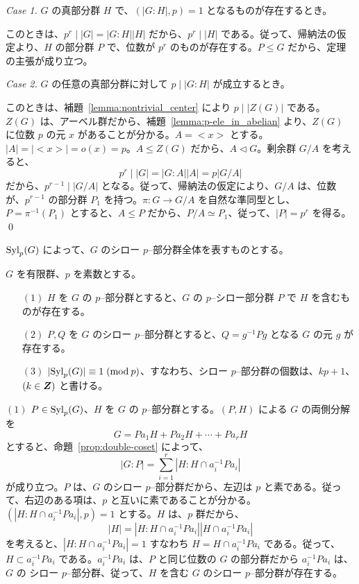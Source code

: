 {\em Case 1.\quad} $G$ の真部分群 $H$ で、$(|G:H|,p) = 1$ となるものが存在するとき。

このときは、$p^r\mid |G| = |G:H||H|$ だから、$p^r\mid |H|$ である。従って、帰納法の仮定より、$H$ の部分群 $P$ で、位数が $p^r$ のものが存在する。$P\leq G$ だから、定理の主張が成り立つ。

\smallskip
{\em Case 2. \quad} $G$ の任意の真部分群に対して $p\mid |G:H|$ が成立するとき。

このときは、補題~\ref{lemma:nontrivial_center} により $p\mid |Z(G)|$ である。$Z(G)$ は、アーベル群だから、補題~\ref{lemma:p-ele_in_abelian} より、$Z(G)$ に位数 $p$ の元 $x$ があることが分かる。$A = <x>$ とする。$|A| = |<x>| = o(x) = p$。$A\leq Z(G)$ だから、$A\lhd G$。剰余群 $G/A$ を考えると、
$$p^r \mid |G| = |G:A||A| = p|G/A|$$
だから、$p^{r-1}\mid |G/A|$ となる。従って、帰納法の仮定により、$G/A$ は、位数が、$p^{r-1}$ の部分群 $P_1$ を持つ。$\pi:G \to G/A$ を自然な準同型とし、$P = \pi^{-1}(P_1)$ とすると、$A \leq P$ だから、$P/A\simeq P_1$、従って、$|P| = p^r$ を得る。
\qed

\medskip
$\mbox{{\rm Syl}}_p(G)$ によって、$G$ のシロー $p$--部分群全体を表すものとする。
\begin{thm} \label{thm:sylow:conjugate}
$G$ を有限群、$p$ を素数とする。
\begin{itemize}
\item[$(1)$] $H$ を $G$ の $p$--部分群とすると、$G$ の $p$--シロー部分群 $P$ で $H$ を含むものが存在する。
\item[$(2)$] $P, Q$ を $G$ のシロー $p$--部分群とすると、$Q = g^{-1}Pg$ となる $G$ の元 $g$ が存在する。
\item[$(3)$] $|\mbox{{\rm Syl}}_p(G)|\equiv 1\;(\mbox{{\rm mod}}\:p)$、すなわち、シロー $p$--部分群の個数は、$kp + 1$、$(k\in\mbox{\boldmath $Z$})$ と書ける。
\end{itemize}
\end{thm}
\proof
$(1)$ $P\in \mbox{{\rm Syl}}_p(G)$、$H$ を $G$ の $p$--部分群とする。$(P,H)$ による $G$ の両側分解を
$$G = Pa_1H + Pa_2H + \cdots + Pa_rH$$
とすると、命題~\ref{prop:double-coset} によって、
$$|G:P| = \sum_{i=1}^r |H:H\cap a^{-1}_iPa_i|$$
が成り立つ。$P$ は、$G$ のシロー $p$--部分群だから、左辺は $p$ と素である。従って、右辺のある項は、$p$ と互いに素であることが分かる。$(|H:H\cap a^{-1}_iPa_i|, p) = 1$ とする。$H$ は、$p$ 群だから、
$$|H| = |H:H\cap a^{-1}_iPa_i||H\cap a^{-1}_iPa_i|$$
を考えると、$|H:H\cap a^{-1}_iPa_i| = 1$ すなわち $H = H\cap a^{-1}_iPa_i$ である。従って、$H\subset a^{-1}_iPa_i$ である。$a^{-1}_iPa_i$ は、$P$ と同じ位数の $G$ の部分群だから $a^{-1}_iPa_i$ は、$G$  の シロー $p$--部分群、従って、$H$ を含む $G$ のシロー $p$--部分群が存在する。

